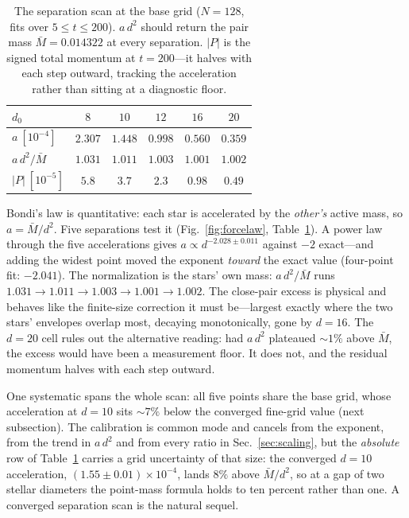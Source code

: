 \documentclass[twocolumn,floatfix,aps,prd,nofootinbib]{revtex4-2}
\begin{document}
\begin{table}[t]
\caption{The separation scan at the base grid ($N=128$, fits over $5\le t\le200$). $a\,d^2$ should return the pair mass $\bar M=0.014322$ at every separation. $|P|$ is the signed total momentum at $t=200$---it halves with each step outward, tracking the acceleration rather than sitting at a diagnostic floor.}
\label{tab:forcelaw}
\begin{ruledtabular}
\begin{tabular}{lccccc}
$d_0$ & $8$ & $10$ & $12$ & $16$ & $20$ \\
\hline
$a\ [10^{-4}]$ & $2.307$ & $1.448$ & $0.998$ & $0.560$ & $0.359$ \\
$a\,d^2/\bar M$ & $1.031$ & $1.011$ & $1.003$ & $1.001$ & $1.002$ \\
$|P|\ [10^{-5}]$ & $5.8$ & $3.7$ & $2.3$ & $0.98$ & $0.49$ \\
\end{tabular}
\end{ruledtabular}
\end{table}

Bondi's law is quantitative: each star is accelerated by the \emph{other's} active mass, so $a=\bar M/d^2$. Five separations test it (Fig.~\ref{fig:forcelaw}, Table~\ref{tab:forcelaw}). A power law through the five accelerations gives \textbf{$a\propto d^{-2.028\pm0.011}$} against $-2$ exact---and adding the widest point moved the exponent \emph{toward} the exact value (four-point fit: $-2.041$). The normalization is the stars' own mass: $a\,d^2/\bar M$ runs $1.031\rightarrow1.011\rightarrow1.003\rightarrow1.001\rightarrow1.002$. The close-pair excess is physical and behaves like the finite-size correction it must be---largest exactly where the two stars' envelopes overlap most, decaying monotonically, gone by $d=16$. The $d=20$ cell rules out the alternative reading: had $a\,d^2$ plateaued ${\sim}1\%$ above $\bar M$, the excess would have been a measurement floor. It does not, and the residual momentum halves with each step outward.

One systematic spans the whole scan: all five points share the base grid, whose acceleration at $d=10$ sits ${\sim}7\%$ below the converged fine-grid value (next subsection). The calibration is common mode and cancels from the exponent, from the trend in $a\,d^2$ and from every ratio in Sec.~\ref{sec:scaling}, but the \emph{absolute} row of Table~\ref{tab:forcelaw} carries a grid uncertainty of that size: the converged $d=10$ acceleration, $(1.55\pm0.01)\times10^{-4}$, lands $8\%$ above $\bar M/d^2$, so at a gap of two stellar diameters the point-mass formula holds to ten percent rather than one. A converged separation scan is the natural sequel.
\end{document}
